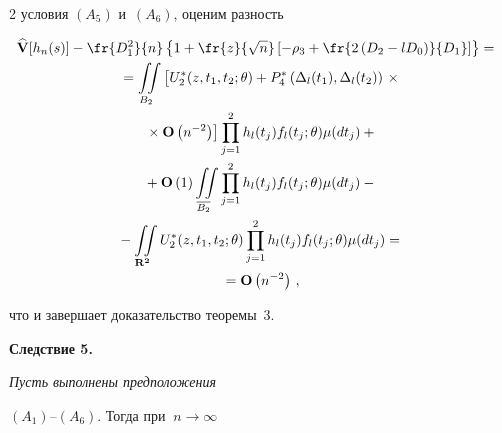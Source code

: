 \begin{multicols}{2}
условия $(A_5)$ и~$(A_6)$, оценим разность


   \begin{multline*}  


\!\!\!\widehat{\bf {V}}[h_n(s)]-\fr{D_1^2}{n}\left\{1+


      \fr{z}{\sqrt{n}} \left[-\rho_3+


      \fr{2\left(D_2-lD_0 \right)}{D_1} \right] \right\}=


   {}\hspace*{-0.5pt}\\


{} =\iint\limits_{B_2} \left[\vphantom{n^{-2}}


U_2^*(z,t_1,t_2;\theta)+


        P_4^* \left(\Delta_l(t_1),\Delta_l(t_2)\right)\right.\times{}\\


\left.{}        \times


        {\bf O}\left(n^{-2}\right)\right]


      \prod_{j=1}^2 h_l(t_j) f_l(t_j;\theta) \mu(dt_j)+


   {}\\


{}   +{\bf O}\left(1\right)\iint\limits_{\overline{B_2}}


        \prod_{j=1}^2 h_l(t_j) f_l(t_j;\theta) \mu(dt_j)-{}


        \\


        {}-


        \iint\limits_{\bf R^2}U_2^*(z,t_1,t_2;\theta)


        \prod_{j=1}^2 h_l(t_j) f_l(t_j;\theta) \mu(dt_j)={}\\


        {}=


        {\bf O}\left(n^{-2}\right)\,,


   \end{multline*}


   что и завершает доказательство теоремы~3.





\bigskip





\noindent


{\bf Следствие 5.} {\it Пусть выполнены предположения


  $(A_1)\mbox{--}(A_6)$. Тогда при $~n\rightarrow\infty$


}
\end{multicols}
